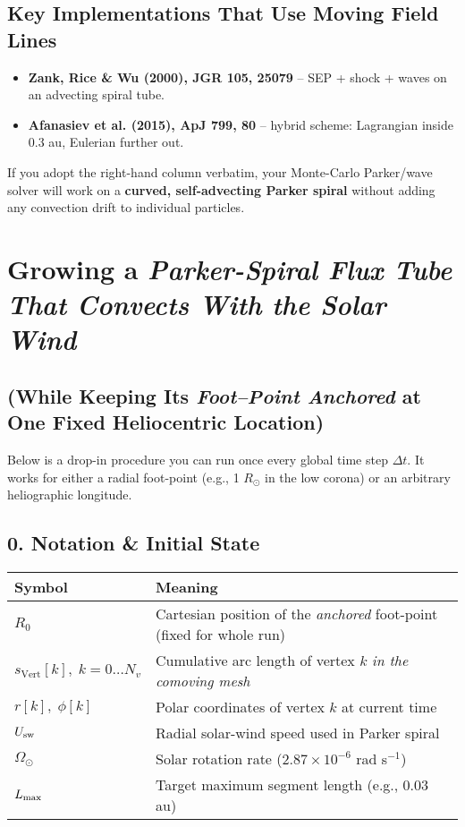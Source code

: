 \subsection*{Key Implementations That Use Moving Field Lines}

\begin{itemize}
\item \textbf{Zank, Rice \& Wu (2000), JGR 105, 25079} – SEP + shock + waves on an advecting spiral tube.
\item \textbf{Afanasiev et al. (2015), ApJ 799, 80} – hybrid scheme: Lagrangian inside 0.3 au, Eulerian further out.
\end{itemize}

\bigskip

If you adopt the right-hand column verbatim, your Monte-Carlo Parker/wave solver will work on a \textbf{curved, self-advecting Parker spiral} without adding any convection drift to individual particles.


\section*{Growing a \emph{Parker-Spiral Flux Tube That Convects With the Solar Wind}}

\subsection*{(While Keeping Its \emph{Foot–Point Anchored} at One Fixed Heliocentric Location)}

Below is a drop-in procedure you can run once every global time step $\Delta t$.
It works for either a radial foot-point (e.g., 1 $R_\odot$ in the low corona) or an arbitrary heliographic longitude.

\subsection*{0. Notation \& Initial State}

\begin{table}[h!]
\centering
\begin{tabular}{|l|p{9cm}|}
\hline
\textbf{Symbol} & \textbf{Meaning} \\
\hline
$R_0$ & Cartesian position of the \emph{anchored} foot-point (fixed for whole run) \\
$s_{\text{Vert}}[k],\;k=0\dots N_v$ & Cumulative arc length of vertex $k$ \emph{in the comoving mesh} \\
$r[k],\;\phi[k]$ & Polar coordinates of vertex $k$ at current time \\
$U_{\rm sw}$ & Radial solar-wind speed used in Parker spiral \\
$\Omega_\odot$ & Solar rotation rate ($2.87 \times 10^{-6}$ rad s$^{-1}$) \\
$L_{\rm max}$ & Target maximum segment length (e.g., 0.03 au) \\
\hline
\end{tabular}
\end{table}

